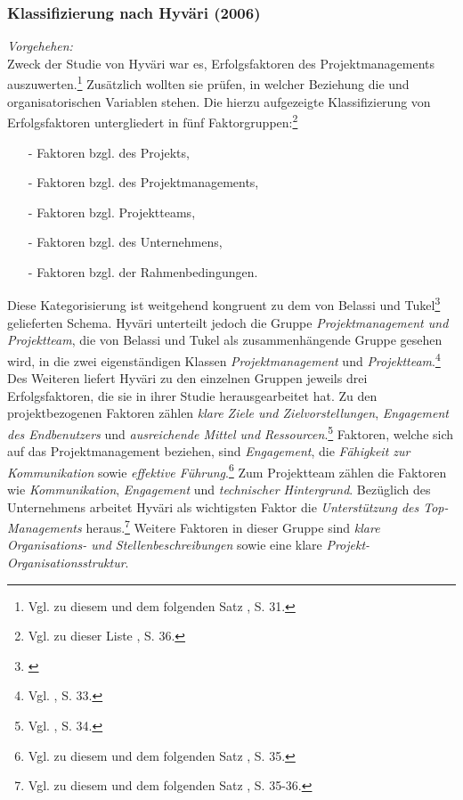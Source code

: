\noindent
\subsubsection{Klassifizierung nach Hyväri (2006)}
\textit{Vorgehehen:}\\\noindent
Zweck der Studie von Hyväri war es, Erfolgsfaktoren des Projektmanagements 
auszuwerten.\footnote{Vgl. zu diesem und dem folgenden Satz \cite{Hyvari.2006}, S. 31.} Zusätzlich wollten sie prüfen, in welcher Beziehung die \EF und organisatorischen Variablen stehen.
Die hierzu aufgezeigte Klassifizierung von Erfolgsfaktoren untergliedert in fünf Faktorgruppen:\footnote{Vgl. zu dieser Liste \cite{Hyvari.2006}, S. 36.}
\begin{itemize}\itemsep0pt
\item[-]Faktoren bzgl. des Projekts,
\item[-]Faktoren bzgl. des Projektmanagements,
\item[-]Faktoren bzgl. Projektteams,
\item[-]Faktoren bzgl. des Unternehmens,
\item[-]Faktoren bzgl. der Rahmenbedingungen.
\end{itemize}
Diese Kategorisierung ist weitgehend kongruent zu dem von Belassi und Tukel\footnote{\cite{Belassi.1996}} gelieferten Schema. Hyväri unterteilt
jedoch die Gruppe \textit{Projektmanagement und Projektteam}, die von Belassi und Tukel als zusammenhängende Gruppe gesehen wird, in die zwei eigenständigen 
Klassen \textit{Projektmanagement} und \textit{Projektteam}.\footnote{Vgl. \cite{Hyvari.2006}, S. 33.}
Des Weiteren liefert Hyväri zu den einzelnen Gruppen jeweils drei Erfolgsfaktoren, die sie in ihrer Studie herausgearbeitet hat. Zu den projektbezogenen Faktoren 
zählen \textit{klare Ziele und Zielvorstellungen}, \textit{Engagement des Endbenutzers} und \textit{ausreichende Mittel und Ressourcen}.\footnote{Vgl. \cite{Hyvari.2006}, S. 34.}
Faktoren, welche sich auf das Projektmanagement beziehen, sind \textit{Engagement}, die \textit{Fähigkeit zur Kommunikation} sowie \textit{effektive Führung}.\footnote{Vgl. zu diesem und dem folgenden Satz \cite{Hyvari.2006}, S. 35.}
Zum Projektteam zählen die Faktoren wie \textit{Kommunikation}, \textit{Engagement} und \textit{technischer Hintergrund}.
Bezüglich des Unternehmens arbeitet Hyväri als wichtigsten Faktor die \textit{Unterstützung des Top-Managements} heraus.\footnote{Vgl. zu diesem und dem folgenden Satz \cite{Hyvari.2006}, S. 35-36.} Weitere Faktoren in dieser Gruppe sind \textit{klare Organisations- und Stellenbeschreibungen} sowie eine klare \textit{Projekt-Organisationsstruktur}.
